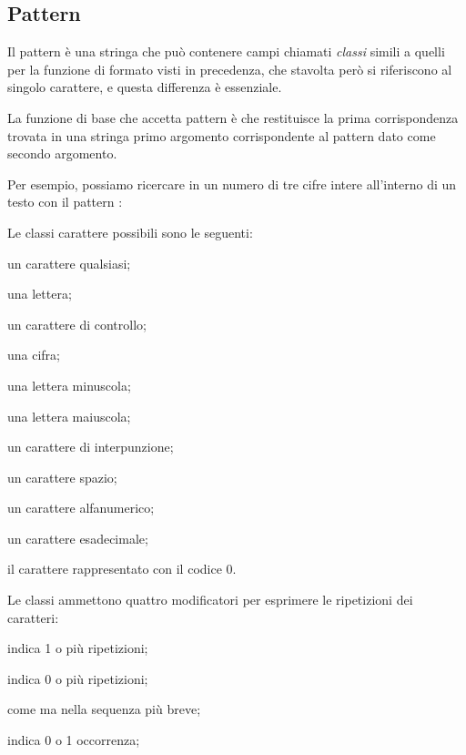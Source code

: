 \subsection{Pattern}
\label{secFondPattern}

Il pattern è una stringa che può contenere campi chiamati \emph{classi} simili
a quelli per la funzione di formato visti in precedenza, che stavolta però si
riferiscono al singolo carattere, e questa differenza è essenziale.

La funzione di base che accetta pattern è  che restituisce
la prima corrispondenza trovata in una stringa primo argomento corrispondente
al pattern dato come secondo argomento.

Per esempio, possiamo ricercare in un numero di tre cifre intere all'interno di
un testo con il pattern :

Le classi carattere possibili sono le seguenti:
\begin{compactdescription}
  \item[\key{.}] un carattere qualsiasi;
  \item[\key{\%a}] una lettera;
  \item[\key{\%c}] un carattere di controllo;
  \item[\key{\%d}] una cifra;
  \item[\key{\%l}] una lettera minuscola;
  \item[\key{\%u}] una lettera maiuscola;
  \item[\key{\%p}] un carattere di interpunzione;
  \item[\key{\%s}] un carattere spazio;
  \item[\key{\%w}] un carattere alfanumerico;
  \item[\key{\%x}] un carattere esadecimale;
  \item[\key{\%z}] il carattere rappresentato con il codice 0.
\end{compactdescription}

Le classi ammettono quattro modificatori per esprimere le ripetizioni dei
caratteri:
\begin{compactdescription}
  \item[\key{+}] indica 1 o più ripetizioni;
  \item[\key{*}] indica 0 o più ripetizioni;
  \item[\key{-}] come \key{*} ma nella sequenza più breve;
  \item[\key{?}] indica 0 o 1 occorrenza;
\end{compactdescription}

